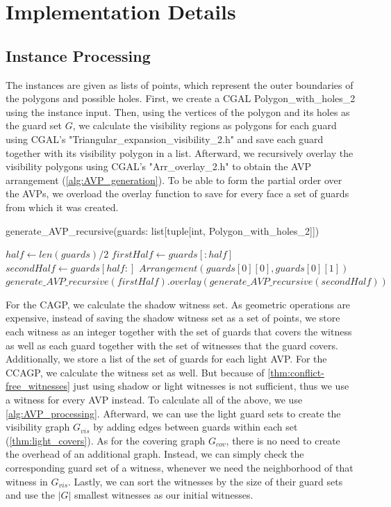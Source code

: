 \chapter{Implementation Details}

\section{Instance Processing}
The instances are given as lists of points, which represent the outer boundaries of the polygons and possible holes. First, we create a CGAL Polygon\_with\_holes\_2 using the instance input. Then, using the vertices of the polygon and its holes as the guard set $G$, we calculate the visibility regions as polygons for each guard using CGAL's "Triangular\_expansion\_visibility\_2.h" and save each guard together with its visibility polygon in a list. Afterward, we recursively overlay the visibility polygons using CGAL's "Arr\_overlay\_2.h" to obtain the AVP arrangement (\cref{alg:AVP_generation}). To be able to form the partial order over the AVPs, we overload the overlay function to save for every face a set of guards from which it was created. 

\begin{algorithm}
\caption{generate\_AVP\_recursive(guards: list[tuple[int, Polygon\_with\_holes\_2]])}\label{alg:AVP_generation}
\begin{algorithmic} 
\STATE $half\gets len(guards)/2$
\STATE $firstHalf\gets guards[:half]$ 
\STATE $secondHalf\gets guards[half:]$
    \STATE $Arrangement(guards[0][0], guards[0][1])$
\ELSE
    \STATE $generate\_AVP\_recursive(firstHalf).overlay(generate\_AVP\_recursive(secondHalf))$
\ENDIF
\end{algorithmic}
\end{algorithm}

For the CAGP, we calculate the shadow witness set. As geometric operations are expensive, instead of saving the shadow witness set as a set of points, we store each witness as an integer together with the set of guards that covers the witness as well as each guard together with the set of witnesses that the guard covers. Additionally, we store a list of the set of guards for each light AVP. For the CCAGP, we calculate the witness set as well. But because of \cref{thm:conflict-free_witnesses} just using shadow or light witnesses is not sufficient, thus we use a witness for every AVP instead. To calculate all of the above, we use \cref{alg:AVP_processing}. Afterward, we can use the light guard sets to create the visibility graph $G_{vis}$ by adding edges between guards within each set (\cref{thm:light_covers}). As for the covering graph $G_{cov}$, there is no need to create the overhead of an additional graph. Instead, we can simply check the corresponding guard set of a witness, whenever we need the neighborhood of that witness in $G_{vis}$. Lastly, we can sort the witnesses by the size of their guard sets and use the $|G|$ smallest witnesses as our initial witnesses.

